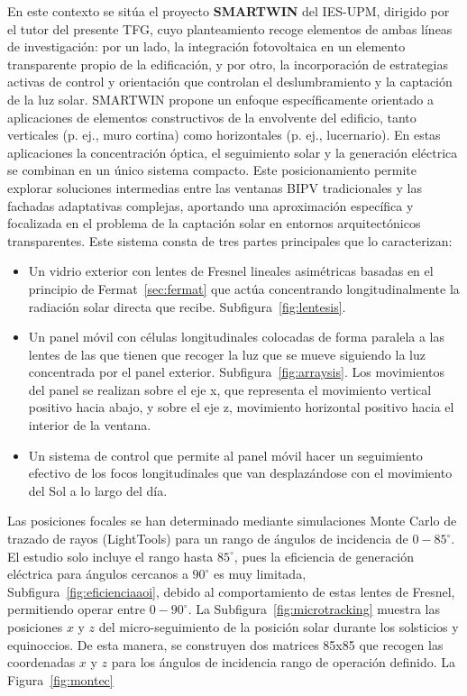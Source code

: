En este contexto se sitúa el proyecto \textbf{SMARTWIN} del IES-UPM, dirigido por el tutor del presente TFG, cuyo planteamiento recoge elementos de ambas líneas de investigación: por un lado, la integración fotovoltaica en un elemento transparente propio de la edificación, y por otro, la incorporación de estrategias activas de control y orientación que controlan el deslumbramiento y la captación de la luz solar. SMARTWIN propone un enfoque específicamente orientado a aplicaciones de elementos constructivos de la envolvente del edificio, tanto verticales (p. ej., muro cortina) como horizontales (p. ej., lucernario). En estas aplicaciones la concentración óptica, el seguimiento solar y la generación eléctrica se combinan en un único sistema compacto. Este posicionamiento permite explorar soluciones intermedias entre las ventanas BIPV tradicionales y las fachadas adaptativas complejas, aportando una aproximación específica y focalizada en el problema de la captación solar en entornos arquitectónicos transparentes. Este sistema consta de tres partes principales que lo caracterizan:

\begin{itemize}
	\item Un vidrio exterior con lentes de Fresnel lineales asimétricas basadas en el principio de Fermat~\ref{sec:fermat} que actúa concentrando longitudinalmente la radiación solar directa que recibe. Subfigura~\ref{fig:lentesis}.
	\item Un panel móvil con células longitudinales colocadas de forma paralela a las lentes de las que tienen que recoger la luz que se mueve siguiendo la luz concentrada por el panel exterior. Subfigura~\ref{fig:arraysis}. Los movimientos del panel se realizan sobre el eje x, que representa el movimiento vertical positivo hacia abajo, y sobre el eje z, movimiento horizontal positivo hacia el interior de la ventana.
	\item Un sistema de control que permite al panel móvil hacer un seguimiento efectivo de los focos longitudinales que van desplazándose con el movimiento del Sol a lo largo del día. 
\end{itemize} 



Las posiciones focales se han determinado mediante simulaciones Monte Carlo de trazado de rayos (LightTools) para un rango de ángulos de incidencia de $0-85^\circ$. El estudio solo incluye el rango hasta $85^\circ$, pues la eficiencia de generación eléctrica para ángulos cercanos a $90^\circ$ es muy limitada, Subfigura~\ref{fig:eficienciaaoi}, debido al comportamiento de estas lentes de Fresnel, permitiendo operar entre $0-90^\circ$. La Subfigura~\ref{fig:microtracking} muestra las posiciones $x$ y $z$ del micro-seguimiento de la posición solar durante los solsticios y equinoccios. 
\label{sec:matriz}
De esta manera, se construyen dos matrices 85x85 que recogen las coordenadas $x$ y $z$ para los ángulos de incidencia rango de operación definido. La Figura~\ref{fig:montec} 

